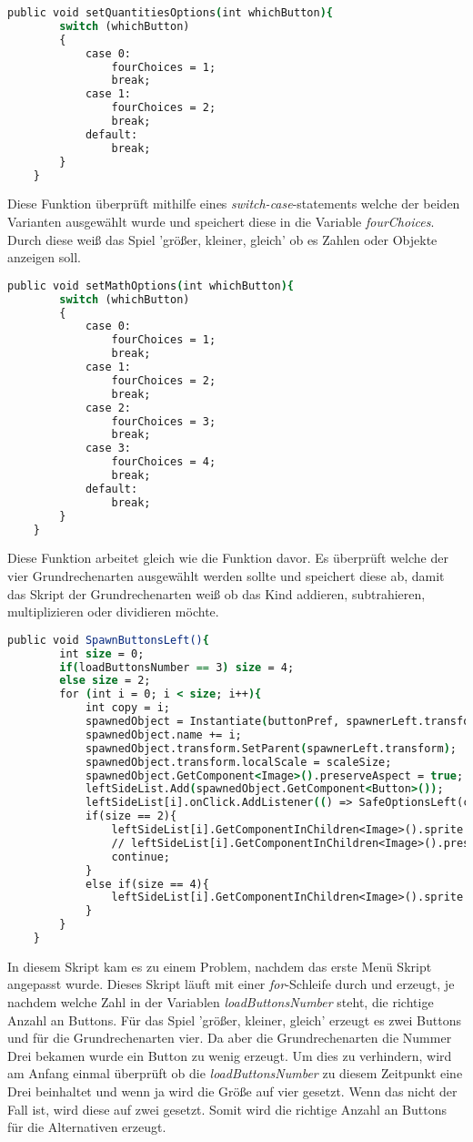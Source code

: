 \begin{lstlisting}[language=csh, caption={MenuPickLevelAdvanced.cs setQuantitiesOptions-Funktion}]
	public void setQuantitiesOptions(int whichButton){
		switch (whichButton)
		{
			case 0:
				fourChoices = 1;
				break;
			case 1:
				fourChoices = 2;
				break;
			default:
				break;
		}
	}
\end{lstlisting}
Diese Funktion überprüft mithilfe eines \textit{switch-case}-statements welche der beiden Varianten ausgewählt wurde und speichert diese in die Variable \textit{fourChoices}. Durch diese weiß das Spiel 'größer, kleiner, gleich' ob es Zahlen oder Objekte anzeigen soll.
\begin{lstlisting}[language=csh, caption={MenuPickLevelAdvanced.cs setMathOptions-Funktion}]
	public void setMathOptions(int whichButton){
		switch (whichButton)
		{
			case 0:
				fourChoices = 1;
				break;
			case 1:
				fourChoices = 2;
				break;
			case 2:
				fourChoices = 3;
				break;
			case 3:
				fourChoices = 4;
				break;
			default:
				break;
		}
	}
\end{lstlisting}
Diese Funktion arbeitet gleich wie die Funktion davor. Es überprüft welche der vier Grundrechenarten ausgewählt werden sollte und speichert diese ab, damit das Skript der Grundrechenarten weiß ob das Kind addieren, subtrahieren, multiplizieren oder dividieren möchte.
\begin{lstlisting}[language=csh, caption={MenuPickLevelAdvanced.cs SpawnButtonsLeft-Funktion}]
	public void SpawnButtonsLeft(){
		int size = 0;
		if(loadButtonsNumber == 3) size = 4;
		else size = 2;
		for (int i = 0; i < size; i++){
			int copy = i;
			spawnedObject = Instantiate(buttonPref, spawnerLeft.transform.position, Quaternion.identity);
			spawnedObject.name += i;
			spawnedObject.transform.SetParent(spawnerLeft.transform);
			spawnedObject.transform.localScale = scaleSize;
			spawnedObject.GetComponent<Image>().preserveAspect = true;
			leftSideList.Add(spawnedObject.GetComponent<Button>());
			leftSideList[i].onClick.AddListener(() => SafeOptionsLeft(copy));
			if(size == 2){
				leftSideList[i].GetComponentInChildren<Image>().sprite = quantitiesModes[i];
				// leftSideList[i].GetComponentInChildren<Image>().preserveAspect = true;
				continue;
			}
			else if(size == 4){
				leftSideList[i].GetComponentInChildren<Image>().sprite = mathModes[i];
			}
		}
	}
\end{lstlisting}
In diesem Skript kam es zu einem Problem, nachdem das erste Menü Skript angepasst wurde. Dieses Skript läuft mit einer \textit{for}-Schleife durch und erzeugt, je nachdem welche Zahl in der Variablen \textit{loadButtonsNumber} steht, die richtige Anzahl an Buttons. Für das Spiel 'größer, kleiner, gleich' erzeugt es zwei Buttons und für die Grundrechenarten vier. Da aber die Grundrechenarten die Nummer Drei bekamen wurde ein Button zu wenig erzeugt. Um dies zu verhindern, wird am Anfang einmal überprüft ob die \textit{loadButtonsNumber} zu diesem Zeitpunkt eine Drei beinhaltet und wenn ja wird die Größe auf vier gesetzt. Wenn das nicht der Fall ist, wird diese auf zwei gesetzt. Somit wird die richtige Anzahl an Buttons für die Alternativen erzeugt.\\
